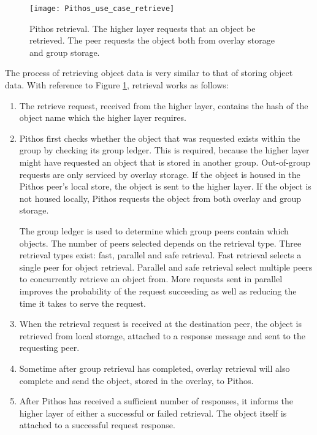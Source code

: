 \begin{figure}[htbp]
 \centering
 \texttt{[image: Pithos\_use\_case\_retrieve]}
 \caption{Pithos retrieval. The higher layer requests that an object be retrieved. The peer requests the object both from overlay storage and group storage.}
 \label{fig_pithos_retrieval}
\end{figure}
%
The process of retrieving object data is very similar to that of storing object data. With reference to Figure \ref{fig_pithos_retrieval}, retrieval works as follows:
%
\begin{enumerate}
\item The retrieve request, received from the higher layer, contains the hash of the object name which the higher layer requires.

\item Pithos first checks whether the object that was requested exists within the group by checking its group ledger. This is required, because the higher layer might have requested an object that is stored in another group. Out-of-group requests are only serviced by overlay storage. If the object is housed in the Pithos peer's local store, the object is sent to the higher layer. If the object is not housed locally, Pithos requests the object from both overlay and group storage.

    The group ledger is used to determine which group peers contain which objects. The number of peers selected depends on the retrieval type. Three retrieval types exist: fast, parallel and safe retrieval. Fast retrieval selects a single peer for object retrieval. Parallel and safe retrieval select multiple peers to concurrently retrieve an object from. More requests sent in parallel improves the probability of the request succeeding as well as reducing the time it takes to serve the request.

\item When the retrieval request is received at the destination peer, the object is retrieved from local storage, attached to a response message and sent to the requesting peer.

\item Sometime after group retrieval has completed, overlay retrieval will also complete and send the object, stored in the overlay, to Pithos.

\item After Pithos has received a sufficient number of responses, it informs the higher layer of either a successful or failed retrieval. The object itself is attached to a successful request response.
\end{enumerate}

